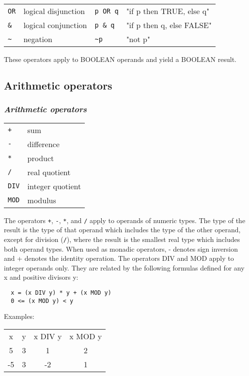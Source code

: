 \begin{tabular}{llll}
\verb|OR|  & logical disjunction & \verb|p OR q| & "if p then TRUE, else q" \\
\verb|&|   & logical conjunction & \verb|p & q|  &  "if p then q, else FALSE" \\
\verb|~|   & negation            & \verb|~p|     &         "not p"  \\
\end{tabular}

\noindent
These operators apply to BOOLEAN operands and yield a BOOLEAN result.

\ifonline
\subsection{Arithmetic operators}
\else
\subsubsection{\em Arithmetic operators}
\fi

\begin{tabular}{ll}
        \verb|+|   & sum                 \\
        \verb|-|   & difference          \\
        \verb|*|   & product             \\
        \verb|/|   & real quotient       \\
        \verb|DIV| & integer quotient    \\
        \verb|MOD| & modulus             \\
\end{tabular}

\noindent
The operators \verb|+|, \verb|-|, \verb|*|, and \verb|/|
apply to operands of numeric types. The
type of the result is the type of that operand which includes the
type of the other operand, except for division (\verb|/|), where the result
is the smallest real type which includes both operand types. When
used as monadic operators, - denotes sign inversion and + denotes
the identity operation. The operators DIV and MOD apply to integer
operands only. They are related by the following formulas defined
for any x and positive divisors y:
\begin{verbatim}
  x = (x DIV y) * y + (x MOD y)
  0 <= (x MOD y) < y
\end{verbatim}

\noindent
Examples:
\begin{flushleft}
\begin{tabular}{cccc}
x  &  y  & x DIV y & x MOD y \\
5  &  3  &   1     &    2    \\
-5 &  3  &  -2     &    1    \\
\end{tabular}
\end{flushleft}

